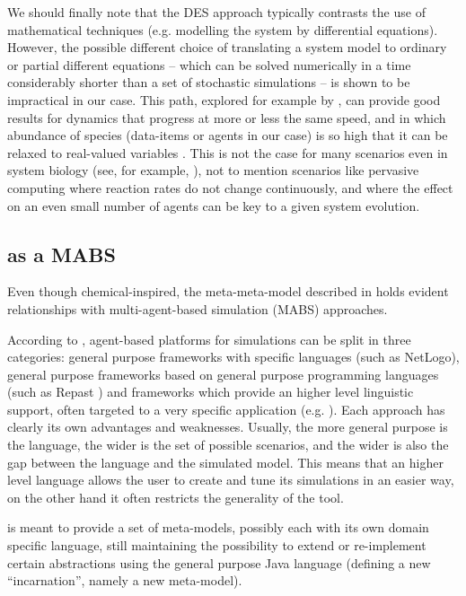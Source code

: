 \documentclass[12pt,a4paper,twoside,openright]{book}
\begin{document}
We should finally note that the DES approach typically contrasts the use of mathematical techniques (e.g. modelling the system by differential equations).
%
However, the possible different choice of translating a system model to ordinary or partial different equations -- which can be solved numerically in a time considerably shorter than a set of stochastic simulations -- is shown to be impractical in our case.
%
This path, explored for example by \cite{MallavarapuInterface2008}, can provide good results for dynamics that progress at more or less the same speed, and in which abundance of species (data-items or agents in our case) is so high that it can be relaxed to real-valued variables \cite{EwaldJOS2007}.
%
This is not the case for many scenarios even in system biology (see, for example, \cite{Cowan2000, UhrmacherWSC2005}), not to mention scenarios like pervasive computing where reaction rates do not change continuously, and where the effect on an even small number of agents can be key to a given system evolution.

\subsection{\alchemist{} as a MABS}

Even though chemical-inspired, the meta-meta-model described in  holds evident relationships with multi-agent-based simulation (MABS) approaches.

According to \cite{BandiniJASSS2009}, agent-based platforms for simulations can be split in three categories: general purpose frameworks with specific languages (such as NetLogo), general purpose frameworks based on general purpose programming languages (such as Repast \cite{repast}) and frameworks which provide an higher level linguistic support, often targeted to a very specific application (e.g. \cite{WeynsAAMAS2006}).
%
Each approach has clearly its own advantages and weaknesses.
%
Usually, the more general purpose is the language, the wider is the set of possible scenarios, and the wider is also the gap between the language and the simulated model.
%
This means that an higher level language allows the user to create and tune its simulations in an easier way, on the other hand it often restricts the generality of the tool. 

\alchemist{} is meant to provide a set of meta-models, possibly each with its own domain specific language, still maintaining the possibility to extend or re-implement certain abstractions using the general purpose Java language (defining a new ``incarnation'', namely a new meta-model).
\end{document}
